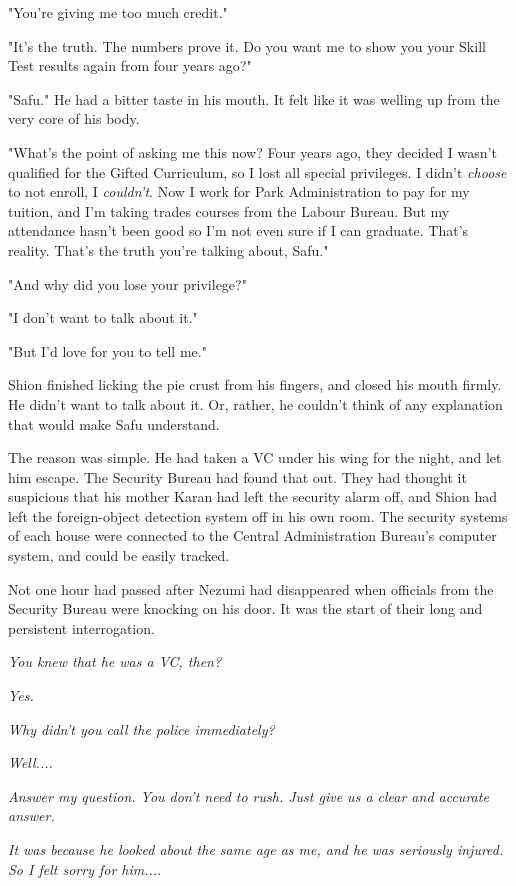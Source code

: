 "You're giving me too much credit."

"It's the truth. The numbers prove it. Do you want me to show you your
Skill Test results again from four years ago?"

"Safu." He had a bitter taste in his mouth. It felt like it was welling
up from the very core of his body.

"What's the point of asking me this now? Four years ago, they decided I
wasn't qualified for the Gifted Curriculum, so I lost all special
privileges. I didn't \emph{choose} to not enroll, I \emph{couldn't}. Now I work for
Park Administration to pay for my tuition, and I'm taking trades courses
from the Labour Bureau. But my attendance hasn't been good so I'm not
even sure if I can graduate. That's reality. That's the truth you're
talking about, Safu."

"And why did you lose your privilege?"

"I don't want to talk about it."

"But I'd love for you to tell me."

Shion finished licking the pie crust from his fingers, and closed his
mouth firmly. He didn't want to talk about it. Or, rather, he couldn't
think of any explanation that would make Safu understand.

The reason was simple. He had taken a VC under his wing for the night,
and let him escape. The Security Bureau had found that out. They had
thought it suspicious that his mother Karan had left the security alarm
off, and Shion had left the foreign-object detection system off in his
own room. The security systems of each house were connected to the
Central Administration Bureau's computer system, and could be easily
tracked.

Not one hour had passed after Nezumi had disappeared when officials from
the Security Bureau were knocking on his door. It was the start of their
long and persistent interrogation.

\emph{You knew that he was a VC, then?}

\emph{Yes.}

\emph{Why didn't you call the police immediately?}

\emph{Well....}

\emph{Answer my question. You don't need to rush. Just give us a clear and
accurate answer.}

\emph{It was because he looked about the same age as me, and he was seriously
injured. So I felt sorry for him....}

